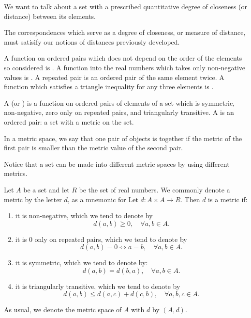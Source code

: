
\sbasic

\sstart
{}


We want to talk about a set
with a prescribed quantitative
degree of closeness (or distance)
between its elements.


The correspondences
which serve as a
degree of closeness,
or measure of distance, must
satisify our notions of distances
previously developed.

A function on ordered pairs which
does not depend on the order of
the elements so considered is
.
A function into the real numbers
which takes only non-negative
values is .
A repeated pair is an ordered pair
of the same element twice.
A function which satisfies
a triangle inequality for any
three elements is
.

A 
(or )
is a function
on ordered pairs of elements
of a set which
is symmetric, non-negative,
zero only on repeated pairs,
and triangularly
transitive.
A 
is an ordered
pair: a set with
a metric on the set.

In a metric space,
we say that one pair
of objects is 
together if
the metric
of the first pair
is smaller than the
metric value of the
second pair.

Notice that a set can be made into
different metric spaces by using
different metrics.


Let $A$ be a set
and let $R$ be the set
of real numbers.
We commonly denote
a metric by the letter
$d$, as a mnemonic
for 
Let $d: A \times A \to R$.
Then $d$ is a metric if:
\begin{enumerate}
  \item
    it is non-negative,
    which we tend to denote by
    $$
      d(a, b) \geq 0, \quad \forall a,b \in A.
    $$
  \item
    it is $0$ only on repeated pairs, which we tend to denote
    by
    $$
      d(a, b) = 0 \Leftrightarrow a = b, \quad \forall a,b \in A.
    $$

  \item
    it is symmetric, which we tend to denote by:
    $$
      d(a, b) = d(b, a), \quad \forall a,b \in A.
    $$
  \item
    it is triangularly transitive, which we tend to
    denote by
    $$
      d(a, b) \leq d(a, c) + d(c, b), \quad \forall a,b,c \in A.
    $$
\end{enumerate}
As usual, we denote the metric space
of $A$ with $d$ by
$(A, d)$.
\strats
